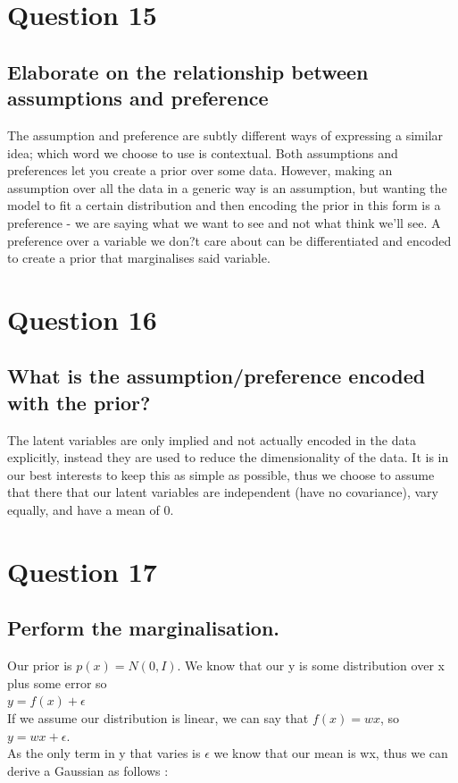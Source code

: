 \documentclass[a4paper, 9pt]{article}
\begin{document}
\section*{Question 15}
\subsection*{Elaborate on the relationship between assumptions and preference}
The assumption and preference are subtly different ways of expressing a similar idea; which word we choose to use is contextual. Both assumptions and preferences let you create a prior over some data. However, making an assumption over all the data in a generic way is an assumption, but wanting the model to fit a certain distribution and then encoding the prior in this form is a preference - we are saying what we want to see and not what think we'll see. A preference over a variable we don?t care about can be differentiated and encoded to create a prior that marginalises said variable.

\section*{Question 16}
\subsection*{What is the assumption/preference encoded with the prior?}
The latent variables are only implied and not actually encoded in the data explicitly, instead they are used to reduce the dimensionality of the data. It is in our best interests to keep this as simple as possible, thus we choose to assume that there that our latent variables are independent (have no covariance), vary equally, and have a mean of 0.

\section*{Question 17}
\subsection*{Perform the marginalisation.}
Our prior is \( p(x) = N (0, I) \). We know that our y is some distribution over x plus some error so \\

 \( y = f(x) + \epsilon \) \\

 If we assume our distribution is linear, we can say that \( f(x) = wx \), so \( y = wx + \epsilon \). \\
As the only term in y that varies is \( \epsilon \) we know that our mean is wx, thus we can derive a Gaussian as follows : \\
\end{document}
